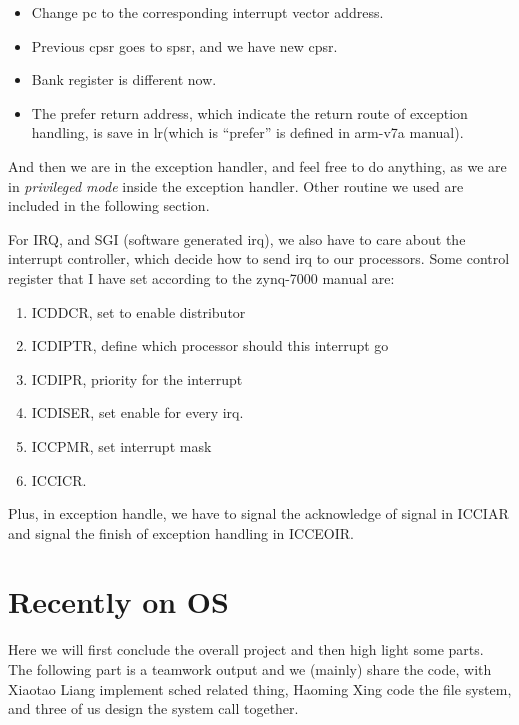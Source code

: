 \documentclass[12pt]{article}
\begin{document}
\begin{itemize}
	\item	Change pc to the corresponding interrupt vector address.
	\item	Previous cpsr goes to spsr, and we have new cpsr.
	\item	Bank register is different now.
	\item	The prefer return address, which indicate the return route of exception handling, is save in lr(which is ``prefer'' is defined in arm-v7a manual).
\end{itemize}

And then we are in the exception handler, and feel free to do anything, as we are in \emph{privileged mode} inside the exception handler. Other routine we used are included in the following section.

For IRQ, and SGI (software generated irq), we also have to care about the interrupt controller, which decide how to send irq to our processors. Some control register that I have set according to the zynq-7000 manual are:
\begin{enumerate}
	\item	ICDDCR, set to enable distributor
	\item	ICDIPTR, define which processor should this interrupt go
	\item	ICDIPR, priority for the interrupt
	\item	ICDISER, set enable for every irq.
	\item	ICCPMR, set interrupt mask
	\item	ICCICR.
\end{enumerate}

Plus, in exception handle, we have to signal the acknowledge of signal in ICCIAR and signal the finish of exception handling in ICCEOIR.

\section{Recently on OS}

Here we will first conclude the overall project and then high light some parts. The following part is a teamwork output and we (mainly) share the code, with Xiaotao Liang implement sched related thing, Haoming Xing code the file system, and three of us design the system call together. 
\end{document}
